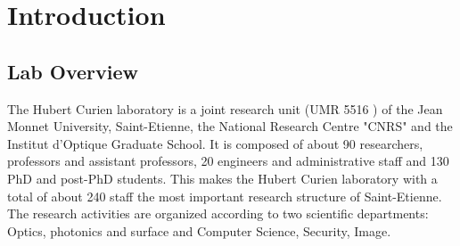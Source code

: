 \documentclass[12pt]{article}
\begin{document}
\section{Introduction}
\subsection{Lab Overview}
The Hubert Curien laboratory is a joint research unit (UMR 5516 ) of the Jean Monnet University, Saint-Etienne, the National Research Centre "CNRS" and the Institut d’Optique Graduate School. It is composed of about 90 researchers, professors and assistant professors, 20 engineers and administrative staff and 130 PhD and post-PhD students. This makes the Hubert Curien laboratory with a total of about 240 staff the most important research structure of Saint-Etienne. The research activities are organized according to two scientific departments: Optics, photonics and  surface and Computer Science, Security, Image.
\end{document}
